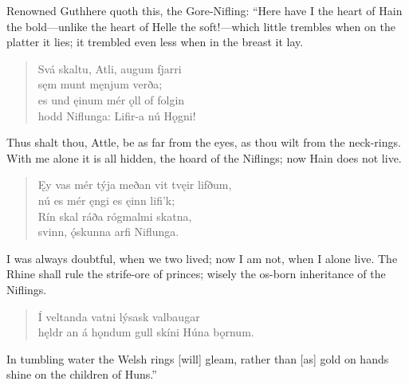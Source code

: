 \bvb Renowned Guthhere quoth this, the Gore-Nifling: “Here have I the heart of Hain the bold—unlike the heart of Helle the soft!—which little trembles when on the platter it lies; it trembled even less when in the breast it lay.

\begin{verse}
\bva Svá skaltu, Atli, \hld augum fjarri \\%
sęm munt \hld męnjum verða; \\%
es und ęinum mér \hld ǫll of folgin \\%
hodd Niflunga: \hld Lifir-a nú Hǫgni!\\%
\end{verse}

\bvb Thus shalt thou, Attle, be as far from the eyes, as thou wilt from the neck-rings. With me alone it is all hidden, the hoard of the Niflings; now Hain does not live.

\begin{verse}
\bva Ęy vas mér týja \hld meðan vit tvęir lifðum, \\%
nú es mér ęngi \hld es ęinn lifi’k; \\%
Rín skal ráða \hld rógmalmi skatna, \\%
svinn, ǫ́skunna \hld arfi Niflunga.\\%
\end{verse}

\bvb I was always doubtful, when we two lived; now I am not, when I alone live. The Rhine shall rule the strife-ore of princes; wisely the os-born inheritance of the Niflings.

\begin{verse}
\bva Í veltanda vatni \hld lýsask valbaugar \\%
hęldr an á hǫndum gull \hld skíni Húna bǫrnum.\\%
\end{verse}

\bvb In tumbling water the Welsh rings [will] gleam, rather than [as] gold on hands shine on the children of Huns.”
